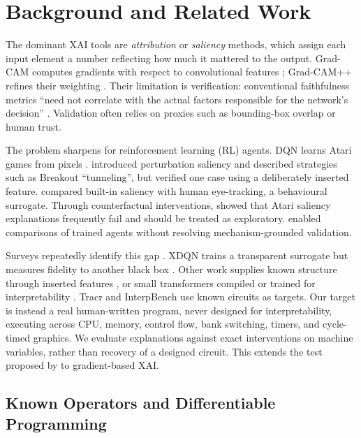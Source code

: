 \documentclass[letterpaper]{article} %
\begin{document}
\section{Background and Related Work}

The dominant XAI tools are \emph{attribution} or \emph{saliency} methods,
which assign each input element a number reflecting how much it mattered to
the output. Grad-CAM computes gradients with respect to convolutional
features \citep{selvaraju2017gradcam}; Grad-CAM++ refines their weighting
\citep{chattopadhyay2018gradcampp}. Their limitation is verification:
conventional faithfulness metrics ``need not correlate with the actual
factors responsible for the network's decision''
\citep{chattopadhyay2018gradcampp}. Validation often relies on proxies
such as bounding-box overlap or human trust.

The problem sharpens for reinforcement learning (RL) agents. DQN learns
Atari games from pixels \citep{mnih2013playing,mnih2015human}.
\citet{greydanus2018visualizing} introduced perturbation saliency
and described strategies such as Breakout ``tunneling'', but verified
one case using a deliberately inserted feature.
\citet{nikulin2019freelunch} compared built-in saliency with human
eye-tracking, a behavioural surrogate. Through counterfactual
interventions, \citet{atrey2020exploratory} showed that Atari saliency
explanations frequently fail and should be treated as exploratory.
\citet{such2019atarizoo} enabled comparisons of trained agents
without resolving mechanism-grounded validation.

Surveys repeatedly identify this gap
\citep{qing2022xrlsurvey,vouros2023xrlsurvey,cheng2025xrlsurvey,saulieres2025xrlsurvey}.
XDQN trains a transparent surrogate but measures fidelity to another
black box \citep{kontogiannis2023xdqn}. Other work supplies known
structure through inserted features \citep{yangkim2019bim}, or
small transformers compiled or trained for interpretability
\citep{lindner2023tracr,gupta2024interpbench}. Tracr and InterpBench
use known circuits as targets. Our target is instead a real
human-written program, never designed for interpretability, executing
across CPU, memory, control flow, bank switching, timers, and
cycle-timed graphics. We evaluate explanations against exact
interventions on machine variables, rather than recovery of a
designed circuit. This extends the test proposed by
\citet{jonas2017could} to gradient-based XAI.

\subsection{Known Operators and Differentiable Programming}
\end{document}
